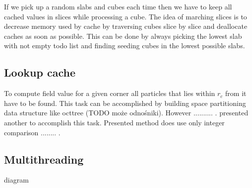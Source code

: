 If we pick up a random slabs and cubes each time then we have to keep all cached values in slices while processing a cube. The idea of marching slices is to decrease memory used by cache by traversing cubes slice by slice and deallocate caches as soon as possible. This can be done by always picking the lowest slab with not empty todo list and finding seeding cubes in the lowest possible slabs. 



\subsection{Lookup cache}\label{sec:lookupcache}
To compute field value for a given corner all particles that lies within $r_c$ from it have to be found. This task can be accomplished by building space partitioning data structure like octtree (TODO może odnośniki). However .......... . \cite{RosenbergBirdwell2008} presented another to accomplish this task. Presented method does use only integer comparison ........ .


\subsection{Multithreading}
diagram

